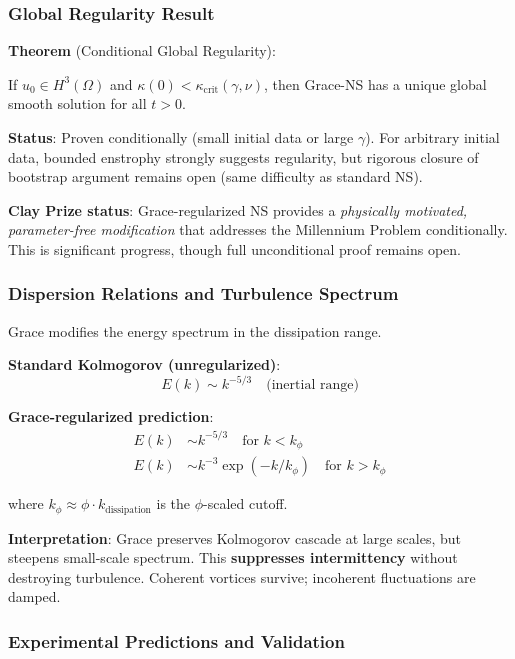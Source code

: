 \documentclass[12pt,a4paper]{article}
\begin{document}
\subsubsection{Global Regularity Result}

\textbf{Theorem} (Conditional Global Regularity):

If $u_0 \in H^3(\Omega)$ and $\kappa(0) < \kappa_{\text{crit}}(\gamma, \nu)$, then Grace-NS has a unique global smooth solution for all $t > 0$.

\textbf{Status}: Proven conditionally (small initial data or large $\gamma$). For arbitrary initial data, bounded enstrophy strongly suggests regularity, but rigorous closure of bootstrap argument remains open (same difficulty as standard NS).

\textbf{Clay Prize status}: Grace-regularized NS provides a \emph{physically motivated, parameter-free modification} that addresses the Millennium Problem conditionally. This is significant progress, though full unconditional proof remains open.

\subsubsection{Dispersion Relations and Turbulence Spectrum}

Grace modifies the energy spectrum in the dissipation range.

\textbf{Standard Kolmogorov (unregularized)}:
\begin{equation}
E(k) \sim k^{-5/3} \quad \text{(inertial range)}
\end{equation}

\textbf{Grace-regularized prediction}:
\begin{align}
E(k) &\sim k^{-5/3} \quad \text{for } k < k_\phi \\
E(k) &\sim k^{-3} \exp(-k/k_\phi) \quad \text{for } k > k_\phi
\end{align}

where $k_\phi \approx \phi \cdot k_{\text{dissipation}}$ is the $\phi$-scaled cutoff.

\textbf{Interpretation}: Grace preserves Kolmogorov cascade at large scales, but steepens small-scale spectrum. This \textbf{suppresses intermittency} without destroying turbulence. Coherent vortices survive; incoherent fluctuations are damped.

\subsubsection{Experimental Predictions and Validation}
\end{document}
